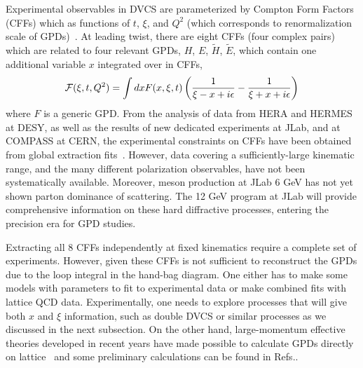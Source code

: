 Experimental observables in DVCS are parameterized by Compton Form Factors (CFFs) which as
functions of $t$, $\xi$, and $Q^2$ (which corresponds to renormalization scale of GPDs)~\cite{Belitsky:2010jw}.
At leading twist, there
are eight CFFs (four complex pairs) which are related to four relevant GPDs, $H$, $E$, $\tilde H$, $\tilde E$, which contain one additional variable $x$ integrated over in CFFs, 
\begin{equation}
     {\cal F}(\xi, t, Q^2) = \int dx F(x, \xi, t)
     \left( \frac{1}{\xi-x+i\epsilon}- \frac{1}{\xi+ x+i\epsilon}          \right)
\end{equation}
where $F$ is a generic GPD. 
From the analysis of data from HERA and HERMES at DESY, as well as the results of new dedicated experiments at JLab, and at COMPASS at CERN, the experimental constraints on CFFs have been obtained from global extraction fits~\cite{Kumericki:2016ehc,Moutarde:2019tqa}.  However, data covering a sufficiently-large kinematic range, and the many different polarization observables, have not been systematically available. Moreover, meson 
production at JLab 6 GeV has not yet shown parton dominance of scattering. The 12 GeV program at JLab will provide comprehensive information on these hard diffractive processes, entering the precision era for GPD studies.

Extracting all 8 CFFs independently at fixed kinematics require a complete set of experiments. However, given these CFFs is not sufficient to reconstruct the GPDs due to the loop integral in 
the hand-bag diagram. One either has to make some models with parameters to fit to experimental data or make combined fits with lattice QCD data.
Experimentally, one needs to explore processes that will give both $x$ and $\xi$ information, such as double DVCS or similar processes as we discussed in the next subsection. On the other hand, large-momentum effective theories developed in recent years have made possible to calculate GPDs directly on lattice~\cite{Ji:2013dva,Ji:2014gla} and some preliminary calculations can be found in Refs.\cite{Lin:2020rxa,Alexandrou:2020okk}. 
 

